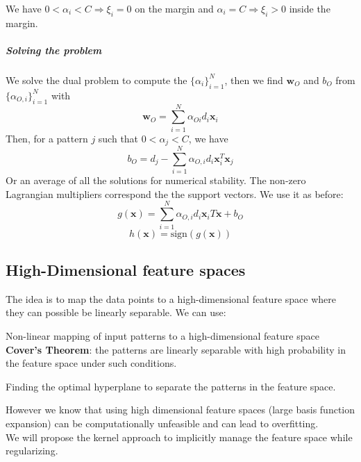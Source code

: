\documentclass[10pt]{report}
\begin{document}
We have $0<\alpha_i<C\Rightarrow\xi_i = 0$ on the margin and $\alpha_i=C\Rightarrow\xi_i > 0$ inside the margin.
\subparagraph{Solving the problem} We solve the dual problem to compute the $\{\alpha_i\}_{i=1}^N$, then we find $\mathbf{w}_O$ and $b_O$ from $\{\alpha_{O,i}\}_{i=1}^N$ with $$\mathbf{w}_O = \sum_{i=1}^N\alpha_{Oi}d_i\mathbf{x}_i$$
Then, for a pattern $j$ such that $0<\alpha_j<C$, we have $$b_O = d_j-\sum_{i=1}^N\alpha_{O,i}d_i\mathbf{x}_i^T\mathbf{x}_j$$
Or an average of all the solutions for numerical stability. The non-zero Lagrangian multipliers correspond the the support vectors. We use it as before: $$g(\mathbf{x}) = \sum_{i=1}^N \alpha_{O,i}d_i\mathbf{x}_iT\mathbf{x} + b_O$$ $$h(\mathbf{x}) = \text{sign}(g(\mathbf{x}))$$
\subsection{High-Dimensional feature spaces}
The idea is to map the data points to a high-dimensional feature space where they can possible be linearly separable. We can use:
\begin{list}{}{}
	\item Non-linear mapping of input patterns to a high-dimensional feature space\\
	\textbf{Cover's Theorem}: the patterns are linearly separable with high probability in the feature space under such conditions.
	\item Finding the optimal hyperplane to separate the patterns in the feature space.
\end{list}
However we know that using high dimensional feature spaces (large basis function expansion) can be computationally unfeasible and can lead to overfitting.\\
We will propose the kernel approach to implicitly manage the feature space while regularizing.
\end{document}
